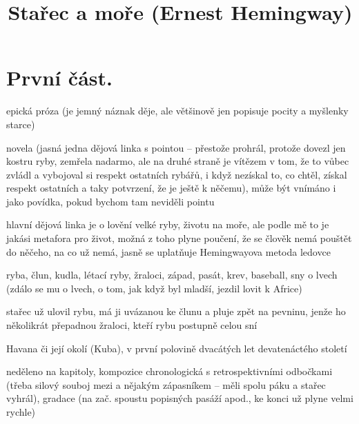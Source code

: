 \documentclass{article}
\title{\vspace{-2cm}Stařec a moře (Ernest Hemingway)\vspace{-2cm}}
\date{}
\author{}
\begin{document}
\maketitle
\section{První část.}
\begin{description}
    \setlength\itemsep{0.15em}
    \item[druh:] epická próza (je jemný náznak děje, ale většinově jen popisuje pocity a myšlenky starce)
    \item[žánr:] novela (jasná jedna dějová linka s pointou -- přestože prohrál, protože dovezl jen kostru ryby, zemřela nadarmo, ale na druhé straně je vítězem v tom, že to vůbec zvládl a vybojoval si respekt ostatních rybářů, i když nezískal to, co chtěl, získal respekt ostatních a taky potvrzení, že je ještě k něčemu), může být vnímáno i jako povídka, pokud bychom tam neviděli pointu
    \item[téma:] hlavní dějová linka je o lovění velké ryby, životu na moře, ale podle mě to je jakási metafora pro život, možná z toho plyne poučení, že se člověk nemá pouštět do něčeho, na co už nemá, jasně se uplatňuje Hemingwayova metoda ledovce
    \item[motivy:] ryba, člun, kudla, létací ryby, žraloci, západ, pasát, krev, baseball, sny o lvech (zdálo se mu o lvech, o tom, jak když byl mladší, jezdil lovit k Africe)
    \item[zařazení výňatku do kontextu díla:] stařec už ulovil rybu, má ji uvázanou ke člunu a pluje zpět na pevninu, jenže ho několikrát přepadnou žraloci, kteří rybu postupně celou sní
    \item[časoprostor:] Havana či její okolí (Kuba), v první polovině dvacátých let devatenáctého století
    \item[kompoziční výstavba:] neděleno na kapitoly, kompozice chronologická s retrospektivními odbočkami (třeba silový souboj mezi  a nějakým zápasníkem -- měli spolu páku a stařec vyhrál), gradace (na zač. spoustu popisných pasáží apod., ke konci už plyne velmi rychle)
\end{description}
\end{document}
